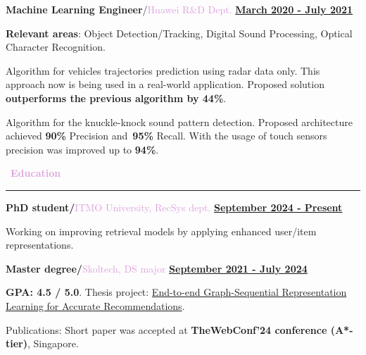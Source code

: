 \documentclass[10pt,a4paper]{report}
\begin{document}
\textbf{\large{Machine Learning Engineer}}/\textcolor{Plum}{Huawei R\&D Dept.}
\hfill
\textbf {\underline{March 2020 - July 2021}}

\textbf{Relevant areas}: Object Detection/Tracking, Digital Sound Processing, Optical Character Recognition.

{\leftskip=3mm
    \vspace{2mm}
    
    \hspace{3mm} Algorithm for vehicles trajectories prediction using radar data only. This approach now is being used in a real-world application. Proposed solution \textbf{outperforms the previous algorithm by 44\%}. 
    
    \vspace{2mm}
    
    \hspace{3mm} Algorithm for the knuckle-knock sound pattern detection. Proposed architecture achieved \textbf{90\%} Precision and~\textbf{95\%} Recall. With the usage of touch sensors precision was improved up to \textbf{94\%}.

    \vspace{2mm}
}

\par\hbox{
\Large{\textcolor{Plum}{\textbf{Education}}}
}{\kern5pt\hrule\kern5pt}

\textbf{\large{PhD student/}}\textcolor{Plum}{ITMO University, RecSys dept.}
\hfill
\textbf{\underline{September 2024 - Present}}

\vspace{2mm}

\hspace{3mm} Working on improving retrieval models by applying enhanced user/item representations.

\vspace{2mm}

\textbf{\large{Master degree/}}\textcolor{Plum}{Skoltech, DS major}
\hfill
\textbf{\underline{September 2021 - July 2024}}

\vspace{2mm}

\hspace{3mm} \textbf{GPA: 4.5 / 5.0}. Thesis project: \href{https://arxiv.org/abs/2403.00895}{End-to-end Graph-Sequential Representation Learning for Accurate Recommendations}.

\vspace{2mm}

\hspace{3mm} Publications: Short paper was accepted at \textbf{TheWebConf'24 conference (A*-tier)}, Singapore. 
\end{document}
